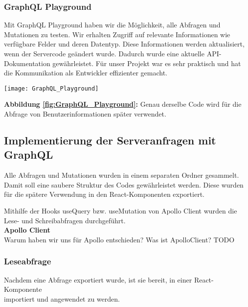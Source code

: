\subsubsection{GraphQL Playground}
Mit GraphQL Playground haben wir die Möglichkeit, alle Abfragen und Mutationen zu testen. Wir erhalten Zugriff auf relevante Informationen wie verfügbare Felder und deren Datentyp. Diese Informationen werden aktualisiert, wenn der Servercode geändert wurde. Dadurch wurde eine aktuelle API-Dokumentation gewährleistet. Für unser Projekt war es sehr praktisch und hat die Kommunikation als Entwickler effizienter gemacht.
\\
\begin{center}
\texttt{[image: GraphQL\_Playground]}\label{fig:GraphQL_Playground}
\end{center}
\textbf{Abbildung \autoref{fig:GraphQL_Playground}:}
Genau derselbe Code wird für die Abfrage von Benutzerinformationen später verwendet.
\newpage

\subsection{Implementierung der Serveranfragen mit GraphQL}
Alle Abfragen und Mutationen wurden in einem separaten Ordner gesammelt.
Damit soll eine saubere Struktur des Codes gewährleistet werden.
Diese wurden für die spätere Verwendung in den React-Komponenten exportiert.

Mithilfe der Hooks useQuery bzw. useMutation von Apollo Client wurden die Lese- und Schreibabfragen durchgeführt.
\\
\textbf{Apollo Client}\\
Warum haben wir uns für Apollo entschieden? Was ist ApolloClient?
TODO
\newpage

\subsubsection{Leseabfrage}
Nachdem eine Abfrage exportiert wurde, ist sie bereit, in einer React-Komponente \\
importiert und angewendet zu werden.

